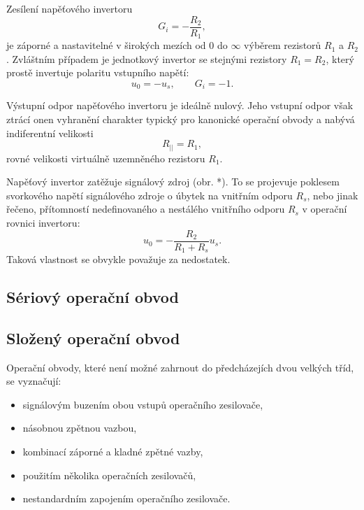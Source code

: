          
      
      Zesílení napěťového invertoru 
      \begin{equation}\label{AES:eq_opamp_inv01}
        G_i = -\frac{R_2}{R_1},
      \end{equation} 
      je záporné a nastavitelné v širokých mezích od $0$ do $\infty$ výběrem rezistorů $R_1$ a 
      $R_2$. Zvláštním případem je jednotkový invertor se stejnými rezistory $R_1 = R_2$, který 
      prostě invertuje polaritu vstupního napětí: $$u_0 = - u_s, \qquad G_i = -1.$$
      
      Výstupní odpor napěťového invertoru je ideálně nulový. Jeho vstupní odpor však ztrácí onen 
      vyhranění charakter typický pro kanonické operační obvody a nabývá indiferentní velikosti 
      \begin{equation}\label{AES:eq_opamp_inv03}
        R_{||} = R_1,
      \end{equation} 
      rovné velikosti virtuálně uzemněného rezistoru $R_1$.
      
      Napěťový invertor zatěžuje signálový zdroj (obr. *). To se projevuje poklesem svorkového 
      napětí signálového zdroje o úbytek na vnitřním odporu $R_s$, nebo jinak řečeno, přítomností 
      nedefinovaného a nestálého vnitřního odporu $R_s$ v operační rovnici invertoru:  
      \begin{equation}\label{AES:eq_opamp_inv04}
       u_0 = -\frac{R_2}{R_1 + R_s}u_s.
      \end{equation}      
      Taková vlastnost se obvykle považuje za nedostatek. 
            
    \subsection{Sériový operační obvod}
    
    \subsection{Složený operační obvod}
      Operační obvody, které není možné zahrnout do předcházejích dvou velkých tříd, se vyznačují:
        \begin{itemize}
          \item signálovým buzením obou vstupů operačního zesilovače,
          \item násobnou zpětnou vazbou,
          \item kombinací záporné a kladné zpětné vazby,
          \item použitím několika operačních zesilovačů,
          \item nestandardním zapojením operačního zesilovače.
        \end{itemize}
